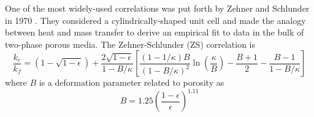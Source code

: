 
One of the most widely-used correlations was put forth by Zehner and Schlunder in 1970 \cite{Zehner1970,Zehner1972}. They considered a cylindrically-shaped unit cell and made the analogy between heat and mass transfer to derive an empirical fit to data in the bulk of two-phase porous media. The Zehner-Schlunder (ZS) correlation is
\begin{equation}
    \frac{k_e}{k_f} = \left(1-\sqrt{1-\epsilon}\right)+\frac{2\sqrt{1-\epsilon}}{1-B/\kappa}\left[\frac{(1-1/\kappa)B}{(1-B/\kappa)^2}\ln\left( \frac{\kappa}{B} \right) - \frac{B+1}{2} - \frac{B-1}{1-B/\kappa}\right]
\end{equation}
where $B$ is a deformation parameter related to porosity as
\begin{equation}\label{eq:zs-B}
    B = 1.25\left(\frac{1-\epsilon}{\epsilon}\right)^{1.11}
\end{equation}



